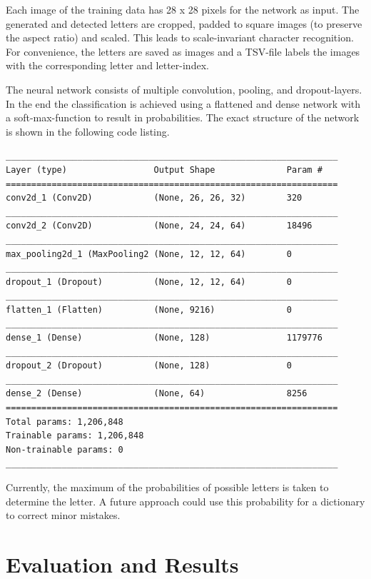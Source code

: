 \documentclass[english, paper=a4]{scrartcl}
\begin{document}
Each image of the training data has 28 x 28 pixels for the network as input. The generated and detected letters are cropped, padded to square images (to preserve the aspect ratio) and scaled. This leads to scale-invariant character recognition. For convenience, the letters are saved as images and a TSV-file labels the images with the corresponding letter and letter-index.

The neural network consists of multiple convolution, pooling, and dropout-layers. In the end the classification is achieved using a flattened and dense network with a soft-max-function to result in probabilities. The exact structure of the network is shown in the following code listing.

\begin{lstlisting}
_________________________________________________________________
Layer (type)                 Output Shape              Param #   
=================================================================
conv2d_1 (Conv2D)            (None, 26, 26, 32)        320       
_________________________________________________________________
conv2d_2 (Conv2D)            (None, 24, 24, 64)        18496     
_________________________________________________________________
max_pooling2d_1 (MaxPooling2 (None, 12, 12, 64)        0         
_________________________________________________________________
dropout_1 (Dropout)          (None, 12, 12, 64)        0         
_________________________________________________________________
flatten_1 (Flatten)          (None, 9216)              0         
_________________________________________________________________
dense_1 (Dense)              (None, 128)               1179776   
_________________________________________________________________
dropout_2 (Dropout)          (None, 128)               0         
_________________________________________________________________
dense_2 (Dense)              (None, 64)                8256      
=================================================================
Total params: 1,206,848
Trainable params: 1,206,848
Non-trainable params: 0
_________________________________________________________________
\end{lstlisting}

Currently, the maximum of the probabilities of possible letters is taken to determine the letter. A future approach could use this probability for a dictionary to correct minor mistakes.

\section{Evaluation and Results}
\end{document}
